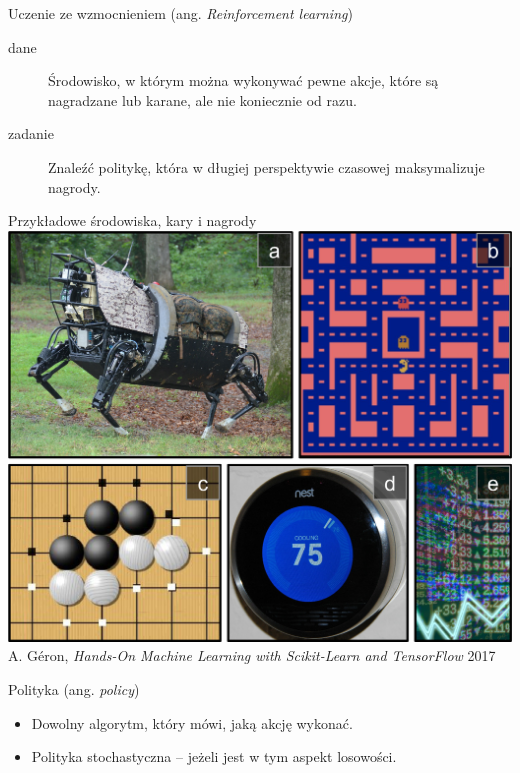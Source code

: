 \documentclass{sa}
\subtitle{Uczenie ze wzmocnieniem}
\newcommand{\ang}[1]{(ang. \emph{#1})}
\begin{document}
\begin{frame}
\titlepage
\end{frame}

\begin{frame}{Uczenie ze wzmocnieniem \ang{Reinforcement learning}}
\begin{description}
\item[dane] \alert{Środowisko}, w którym można wykonywać pewne \alert{akcje}, które są \alert{nagradzane} lub \alert{karane}, ale nie koniecznie od razu.
\pause
\item[zadanie] Znaleźć \alert{politykę}, która w długiej perspektywie czasowej maksymalizuje nagrody.
\end{description}
\end{frame}

\begin{frame}{Przykładowe środowiska, kary i nagrody}
\centering
\includegraphics[width=.75\textwidth]{mlst_1601.png}
{\vfill\footnotesize A. Géron, \emph{Hands-On Machine Learning with Scikit-Learn and TensorFlow} 2017}
\end{frame}

\begin{frame}{Polityka \ang{policy}}
\begin{itemize}
\item<+-> Dowolny algorytm, który mówi, jaką akcję wykonać.
\item<+-> Polityka \alert{stochastyczna} -- jeżeli jest w tym aspekt losowości.
\end{itemize}
\end{frame}
\end{document}
